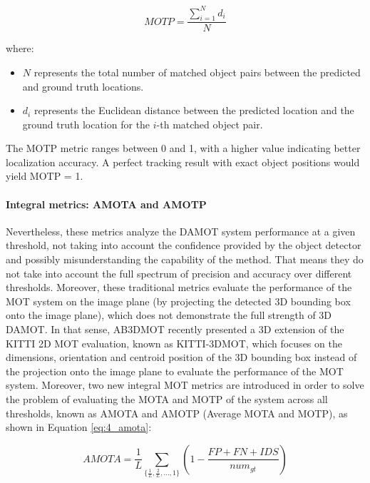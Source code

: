 \begin{equation}
	MOTP = \frac{{\sum_{{i=1}}^{{N}} d_i}}{{N}}
\end{equation}

where:
\begin{itemize}
	\item \(N\) represents the total number of matched object pairs between the predicted and ground truth locations.
	\item \(d_i\) represents the Euclidean distance between the predicted location and the ground truth location for the \(i\)-th matched object pair.
\end{itemize}

The MOTP metric ranges between 0 and 1, with a higher value indicating better localization accuracy. A perfect tracking result with exact object positions would yield MOTP = 1.

\paragraph{Integral metrics: AMOTA and AMOTP}
\label{par:4_integral_metrics}

Nevertheless, these metrics analyze the \ac{DAMOT} system performance at a given threshold, not taking into account the confidence provided by the object detector and possibly misunderstanding the capability of the method. That means they do not take into account the full spectrum of precision and accuracy over different thresholds. Moreover, these traditional metrics evaluate the performance of the MOT system on the image plane (by projecting the detected 3D bounding box onto the image plane), which does not demonstrate the full strength of 3D \ac{DAMOT}. In that sense, AB3DMOT \cite{weng20203d} recently presented a 3D extension of the KITTI 2D MOT evaluation, known as KITTI-3DMOT, which focuses on the dimensions, orientation and centroid position of the 3D bounding box instead of the projection onto the image plane to evaluate the performance of the MOT system. Moreover, two new integral MOT metrics are introduced in order to solve the problem of evaluating the MOTA and MOTP of the system across all thresholds, known as AMOTA and AMOTP (Average MOTA and MOTP), as shown in Equation \ref{eq:4_amota}:

\begin{equation}
	\label{eq:4_amota}
	AMOTA = \frac{1}{L}\sum_{\{\frac{1}{L},\frac{2}{L},...,1\}}(1-\frac{FP+FN+IDS}{num_{gt}})
\end{equation}

